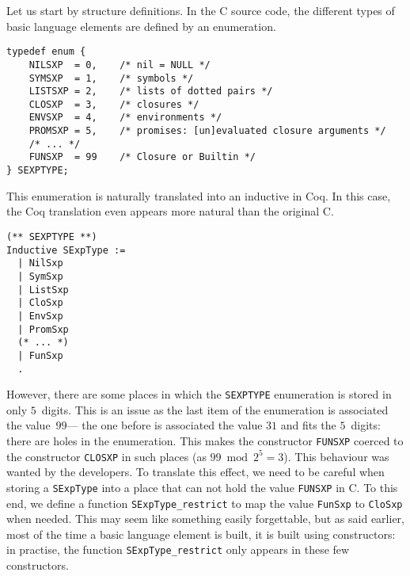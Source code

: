 \documentclass{article}
\newcommand\Coq{Coq}
\newcommand\Cn{C}
\begin{document}
Let us start by structure definitions.
In the \Cn{} source code, the different types of basic language elements
are defined by an enumeration.
\begin{verbatim}
typedef enum {
    NILSXP  = 0,    /* nil = NULL */
    SYMSXP  = 1,    /* symbols */
    LISTSXP = 2,    /* lists of dotted pairs */
    CLOSXP  = 3,    /* closures */
    ENVSXP  = 4,    /* environments */
    PROMSXP = 5,    /* promises: [un]evaluated closure arguments */
    /* ... */
    FUNSXP  = 99    /* Closure or Builtin */
} SEXPTYPE;
\end{verbatim}
This enumeration is naturally translated into an inductive in \Coq{}.
In this case,
the \Coq{} translation even appears more natural than the original \Cn{}.
\begin{verbatim}
(** SEXPTYPE **)
Inductive SExpType :=
  | NilSxp
  | SymSxp
  | ListSxp
  | CloSxp
  | EnvSxp
  | PromSxp
  (* ... *)
  | FunSxp
  .
\end{verbatim}
However, there are some places in which the \texttt{SEXPTYPE}
enumeration is stored in only \(5\)~digits.
This is an issue as the last item of the enumeration
is associated the value~\(99\)—%
the one before is associated the value \(31\) and fits the \(5\)~digits:
there are holes in the enumeration.
This makes the constructor \texttt{FUNSXP} coerced
to the constructor \texttt{CLOSXP} in such places
(as \(99 \bmod 2^5 = 3\)).
This behaviour was wanted by the developers.
To translate this effect,
we need to be careful when storing a \texttt{SExpType}
into a place that can not hold the value \texttt{FUNSXP} in \Cn{}.
To this end, we define a function
\texttt{SExpType_restrict} to map the value
\texttt{FunSxp} to \texttt{CloSxp} when needed.
This may seem like something easily forgettable,
but as said earlier, most of the time a basic language element is built,
it is built using constructors:
in practise, the function \texttt{SExpType_restrict}
only appears in these few constructors.
\end{document}
